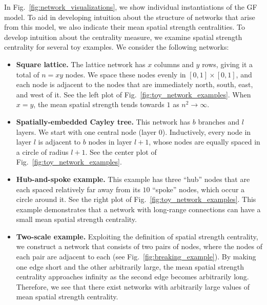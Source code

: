 \documentclass[%
 reprint,
 amsmath,amssymb,
 aps,
]{revtex4-1}
\begin{document}
In Fig.~\ref{fig:network_visualizations}, we show individual instantiations of the GF model. To aid in developing intuition about the structure of networks that arise from this model, we also indicate their mean spatial strength centralities. To develop intuition about the centrality measure, we examine spatial strength centrality for several toy examples. We consider the following networks:
\begin{itemize}
\item{\textbf{Square lattice.} The lattice network has $x$ columns and $y$ rows, giving it a total of $n = xy$ nodes. We space these nodes evenly in $[0,1] \times [0,1]$, and each node is adjacent to the nodes that are immediately north, south, east, and west of it. See the left plot of Fig.~\ref{fig:toy_network_examples}. When $x=y$, the mean spatial strength tends towards $1$ as $n^2 \rightarrow \infty$.
}
\item{\textbf{Spatially-embedded Cayley tree.} This network has $b$ branches and $l$ layers. We start with one central node (layer $0$). Inductively, every node in layer $l$ is adjacent to $b$ nodes in layer $l+1$, whose nodes are equally spaced in a circle of radius $l+1$. See the center plot of Fig.~\ref{fig:toy_network_examples}. 
}
\item{\textbf{Hub-and-spoke example.} This example has three ``hub'' nodes that are each spaced relatively far away from its $10$ ``spoke'' nodes, which occur a circle around it. See the right plot of Fig.~\ref{fig:toy_network_examples}. This example demonstrates that a network with long-range connections can have a small mean spatial strength centrality. 
}
\item{\textbf{Two-scale example.} Exploiting the definition of spatial strength centrality, we construct a network that consists of two pairs of nodes, where the nodes of each pair are adjacent to each (see Fig.~\ref{fig:breaking_example}). By making one edge short and the other arbitrarily large, the mean spatial strength centrality approaches infinity as the second edge becomes arbitrarily long. Therefore, we see that there exist networks with arbitrarily large values of mean spatial strength centrality. 
}
\end{itemize}
\end{document}
